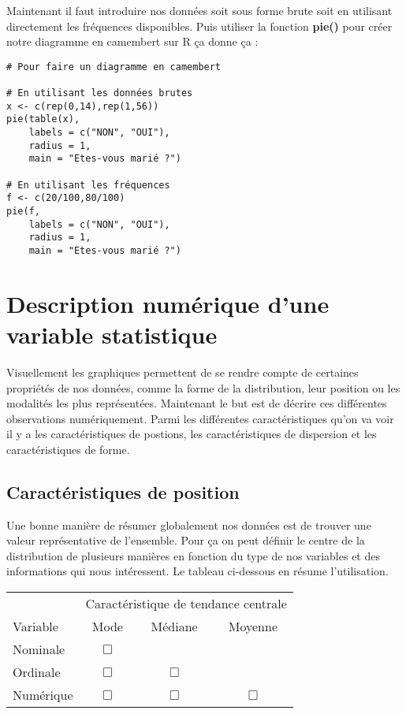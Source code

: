\documentclass{report}
\begin{document}
Maintenant il faut introduire nos données soit sous forme brute soit en utilisant directement les fréquences disponibles. Puis utiliser la fonction \textbf{pie()} pour créer notre diagramme en camembert sur R ça donne ça :

\newpage

\begin{verbatim}
# Pour faire un diagramme en camembert

# En utilisant les données brutes
x <- c(rep(0,14),rep(1,56))
pie(table(x), 
    labels = c("NON", "OUI"), 
    radius = 1, 
    main = "Etes-vous marié ?")
    
# En utilisant les fréquences 
f <- c(20/100,80/100)
pie(f, 
    labels = c("NON", "OUI"), 
    radius = 1, 
    main = "Etes-vous marié ?")
\end{verbatim}
\section{Description numérique d’une variable statistique}
Visuellement les graphiques permettent de se rendre compte de certaines propriétés de nos données, comme la forme de la distribution, leur position ou les modalités les plus représentées. Maintenant le but est de décrire ces différentes observations numériquement. Parmi les différentes caractéristiques qu'on va voir il y a les caractéristiques de postions, les caractéristiques de dispersion et les caractéristiques de forme.
\subsection{Caractéristiques de position}

Une bonne manière de résumer globalement nos données est de trouver une valeur représentative de l'ensemble. Pour ça on peut définir le centre de la distribution de plusieurs manières en fonction du type de nos variables et des informations qui nous intéressent. Le tableau ci-dessous en résume l'utilisation.

\quad
\begin{center}
\begin{tabular}{l c c c} 
\hline
&\multicolumn{3}{c}{Caractéristique de tendance centrale} \\ \cline{2-4}
Variable&Mode&Médiane&Moyenne\\
\hline
Nominale & $\Box$ &  &   \\
Ordinale & $\Box$ & $\Box$&  \\
Numérique & $\Box$ & $\Box$& $\Box$  \\
\hline
\end{tabular}
\end{center}
\quad
\end{document}
